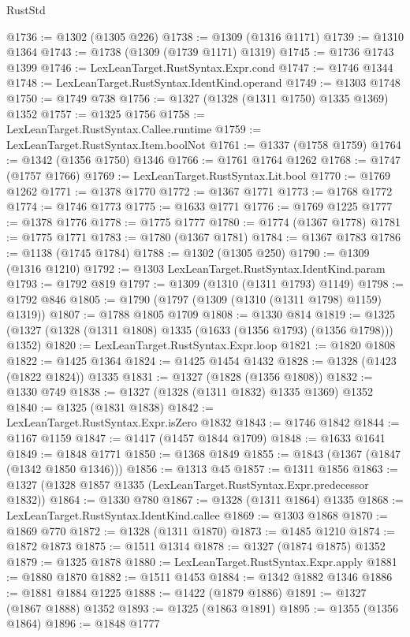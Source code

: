 \begin{lexlean}{RustStd}
\begin{coremodule}
@1736 := @1302 (@1305 @226)
@1738 := @1309 (@1316 @1171)
@1739 := @1310 @1364
@1743 := @1738 (@1309 (@1739 @1171) @1319)
@1745 := @1736 @1743 @1399
@1746 := LexLeanTarget.RustSyntax.Expr.cond
@1747 := @1746 @1344
@1748 := LexLeanTarget.RustSyntax.IdentKind.operand
@1749 := @1303 @1748
@1750 := @1749 @738
@1756 := @1327 (@1328 (@1311 @1750) @1335 @1369) @1352
@1757 := @1325 @1756
@1758 := LexLeanTarget.RustSyntax.Callee.runtime
@1759 := LexLeanTarget.RustSyntax.Item.boolNot
@1761 := @1337 (@1758 @1759)
@1764 := @1342 (@1356 @1750) @1346
@1766 := @1761 @1764 @1262
@1768 := @1747 (@1757 @1766)
@1769 := LexLeanTarget.RustSyntax.Lit.bool
@1770 := @1769 @1262
@1771 := @1378 @1770
@1772 := @1367 @1771
@1773 := @1768 @1772
@1774 := @1746 @1773
@1775 := @1633 @1771
@1776 := @1769 @1225
@1777 := @1378 @1776
@1778 := @1775 @1777
@1780 := @1774 (@1367 @1778)
@1781 := @1775 @1771
@1783 := @1780 (@1367 @1781)
@1784 := @1367 @1783
@1786 := @1138 (@1745 @1784)
@1788 := @1302 (@1305 @250)
@1790 := @1309 (@1316 @1210)
@1792 := @1303 LexLeanTarget.RustSyntax.IdentKind.param
@1793 := @1792 @819
@1797 := @1309 (@1310 (@1311 @1793) @1149)
@1798 := @1792 @846
@1805 := @1790 (@1797 (@1309 (@1310 (@1311 @1798) @1159) @1319))
@1807 := @1788 @1805 @1709
@1808 := @1330 @814
@1819 := @1325 (@1327 (@1328 (@1311 @1808) @1335 (@1633 (@1356 @1793) (@1356 @1798))) @1352)
@1820 := LexLeanTarget.RustSyntax.Expr.loop
@1821 := @1820 @1808
@1822 := @1425 @1364
@1824 := @1425 @1454 @1432
@1828 := @1328 (@1423 (@1822 @1824)) @1335
@1831 := @1327 (@1828 (@1356 @1808))
@1832 := @1330 @749
@1838 := @1327 (@1328 (@1311 @1832) @1335 @1369) @1352
@1840 := @1325 (@1831 @1838)
@1842 := LexLeanTarget.RustSyntax.Expr.isZero @1832
@1843 := @1746 @1842
@1844 := @1167 @1159
@1847 := @1417 (@1457 @1844 @1709)
@1848 := @1633 @1641
@1849 := @1848 @1771
@1850 := @1368 @1849
@1855 := @1843 (@1367 (@1847 (@1342 @1850 @1346)))
@1856 := @1313 @45
@1857 := @1311 @1856
@1863 := @1327 (@1328 @1857 @1335 (LexLeanTarget.RustSyntax.Expr.predecessor @1832))
@1864 := @1330 @780
@1867 := @1328 (@1311 @1864) @1335
@1868 := LexLeanTarget.RustSyntax.IdentKind.callee
@1869 := @1303 @1868
@1870 := @1869 @770
@1872 := @1328 (@1311 @1870)
@1873 := @1485 @1210
@1874 := @1872 @1873
@1875 := @1511 @1314
@1878 := @1327 (@1874 @1875) @1352
@1879 := @1325 @1878
@1880 := LexLeanTarget.RustSyntax.Expr.apply
@1881 := @1880 @1870
@1882 := @1511 @1453
@1884 := @1342 @1882 @1346
@1886 := @1881 @1884 @1225
@1888 := @1422 (@1879 @1886)
@1891 := @1327 (@1867 @1888) @1352
@1893 := @1325 (@1863 @1891)
@1895 := @1355 (@1356 @1864)
@1896 := @1848 @1777

\end{coremodule}
\end{lexlean}
